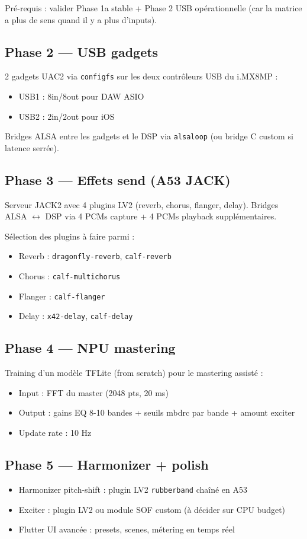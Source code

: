\documentclass[11pt,a4paper]{article}
\begin{document}
Pré-requis : valider Phase 1a stable + Phase 2 USB opérationnelle (car la matrice a plus de sens quand il y a plus d'inputs).

\subsection{Phase 2 --- USB gadgets}
2 gadgets UAC2 via \texttt{configfs} sur les deux contrôleurs USB du i.MX8MP :
\begin{itemize}[leftmargin=*, itemsep=1pt]
  \item USB1 : 8in/8out pour DAW ASIO
  \item USB2 : 2in/2out pour iOS
\end{itemize}
Bridges ALSA entre les gadgets et le DSP via \texttt{alsaloop} (ou bridge C custom si latence serrée).

\subsection{Phase 3 --- Effets send (A53 JACK)}
Serveur JACK2 avec 4 plugins LV2 (reverb, chorus, flanger, delay). Bridges ALSA $\leftrightarrow$ DSP via 4 PCMs capture + 4 PCMs playback supplémentaires.

Sélection des plugins à faire parmi :
\begin{itemize}[leftmargin=*, itemsep=1pt]
  \item Reverb : \texttt{dragonfly-reverb}, \texttt{calf-reverb}
  \item Chorus : \texttt{calf-multichorus}
  \item Flanger : \texttt{calf-flanger}
  \item Delay : \texttt{x42-delay}, \texttt{calf-delay}
\end{itemize}

\subsection{Phase 4 --- NPU mastering}
Training d'un modèle TFLite (from scratch) pour le mastering assisté :
\begin{itemize}[leftmargin=*, itemsep=1pt]
  \item Input : FFT du master (2048 pts, 20 ms)
  \item Output : gains EQ 8-10 bandes + seuils mbdrc par bande + amount exciter
  \item Update rate : 10 Hz
\end{itemize}

\subsection{Phase 5 --- Harmonizer + polish}
\begin{itemize}[leftmargin=*, itemsep=1pt]
  \item Harmonizer pitch-shift : plugin LV2 \texttt{rubberband} chaîné en A53
  \item Exciter : plugin LV2 ou module SOF custom (à décider sur CPU budget)
  \item Flutter UI avancée : presets, scenes, métering en temps réel
\end{itemize}
\end{document}
